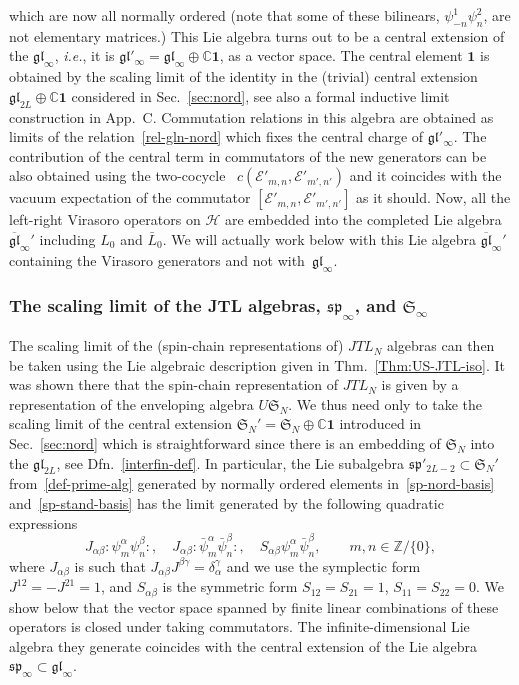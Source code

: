 \documentclass[11pt]{article}
\newcommand{\one}{\boldsymbol{1}}%
\newcommand{\JTL}[1]{JTL_{#1}}
\newcommand{\sferm}{\psi}
\newcommand{\bsferm}{\bar{\psi}}
\newcommand{\sfermp}{\psi^{2}}
\newcommand{\sfermm}{\psi^{1}}
\newcommand{\Hilb}{\mathcal{H}}
\newcommand{\oC}{\mathbb{C}}
\newcommand{\oZ}{\mathbb{Z}}
\newcommand{\interLie}{\mathfrak{S}}
\newcommand{\interfin}[1]{\interLie_{#1}}
\newcommand{\glinf}{\gl_{\infty}}
\newcommand{\bglinf}{\overline{\gl}_{\infty}}
\newcommand{\glinfc}{\gl'_{\infty}}
\newcommand{\glinfco}{\bglinf'}
\newcommand{\spinf}{\ssp_{\infty}}
\newcommand{\interinfin}{\interLie_{\infty}}
\newcommand{\Egl}{\mathcal{E}}
\newcommand{\gl}{\mathfrak{gl}}
\newcommand{\ssp}{\mathfrak{sp}}
\newcommand{\AppLim}{C}
\newcommand{\nord}[1]{\boldsymbol{\colon}\!\!{#1}\boldsymbol{\colon}\!\!}
\theoremstyle{definition}
\begin{document}
which are now all normally ordered (note that some of these bilinears, $\sfermm_{-n}\sfermp_{n}$, are not elementary matrices.) This Lie algebra turns out to be a central extension of the $\glinf$, {\it i.e.}, it is $\glinfc=\glinf\oplus \oC\one$, as a vector space. The central element $\one$ is obtained by the scaling limit of the identity in the (trivial) central extension $\gl_{2L}\oplus\oC\one$ considered in Sec.~\ref{sec:nord}, see also a formal inductive limit construction in  App.~\AppLim. Commutation relations in this algebra are obtained as limits of the relation~\eqref{rel-gln-nord} which fixes the central charge of $\glinfc$.  The  contribution of the central term in commutators of the new generators can be also obtained using the two-cocycle~\cite{Kac-book} $c(\Egl'_{m,n},\Egl'_{m',n'})$ and it coincides with the vacuum expectation of the commutator $[\Egl'_{m,n},\Egl'_{m',n'}]$ as it should. Now, all the left-right Virasoro operators on $\Hilb$ are embedded  into the completed Lie algebra $\glinfco$ including  $L_0$ and $\bar{L}_0$. We will actually work below with this Lie algebra $\glinfco$ containing the Virasoro generators and not with~$\glinf$.

\subsubsection{The scaling limit of the JTL algebras, $\spinf$, and $\interinfin$}\label{sec:interinfin}

The scaling limit of the (spin-chain representations of) $\JTL{N}$ algebras can then be taken using the Lie algebraic description given in Thm.~\ref{Thm:US-JTL-iso}. It was shown there that the spin-chain representation  of $\JTL{N}$ is given by a representation of the enveloping algebra $U \interfin{N}$.  We thus need only to take the scaling limit of the central extension $\interfin{N}'=\interfin{N}\oplus\oC\one$ introduced in Sec.~\ref{sec:nord} which is straightforward since there is an embedding of $\interfin{N}$ into the $\gl_{2L}$, see Dfn.~\ref{interfin-def}.  In particular, the  Lie subalgebra $\ssp'_{2L-2}\subset\interfin{N}'$ from~\eqref{def-prime-alg} generated by normally ordered elements in~\eqref{sp-nord-basis} and~\eqref{sp-stand-basis} has the limit generated by the following quadratic expressions
\begin{equation}\label{spinf-gen}
J_{\alpha\beta}\nord{\sferm^{\alpha}_{m}\sferm^{\beta}_{n}},\quad
J_{\alpha\beta}\nord{\bsferm^{\alpha}_{m}\bsferm^{\beta}_{n}},\quad
 S_{\alpha\beta} \psi^{\alpha}_m \bar{\psi}^{\beta}_n,\qquad m,n\in\oZ/\{0\},
\end{equation}
where $J_{\alpha\beta}$ is such that $J_{\alpha\beta}J^{\beta\gamma}=\delta^{\gamma}_{\alpha}$ and we use  the symplectic form $J^{12}=-J^{21}=1$, and $S_{\alpha\beta}$ is the symmetric form $S_{12}=S_{21}=1$, $S_{11}=S_{22}=0$. We  show below that the vector space spanned by finite linear combinations of these operators is closed under taking commutators.
The infinite-dimensional Lie algebra they generate coincides with the central extension of the Lie algebra $\spinf\subset\glinf$.
\end{document}

